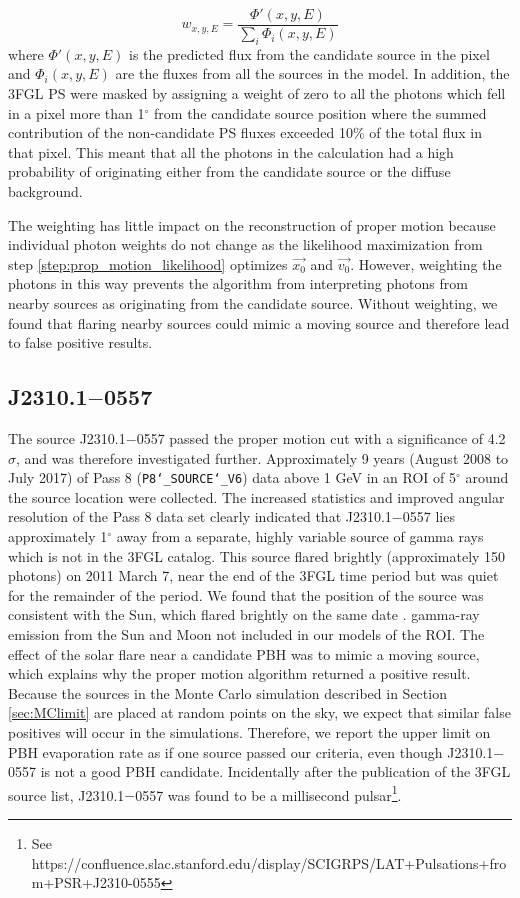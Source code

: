\begin{equation}
w_{x,y,E} = \frac{\Phi'(x,y,E)}{\sum_i \Phi_i(x,y,E)}
\end{equation}
where $\Phi'(x,y,E)$ is the predicted flux from the candidate source in the pixel and $\Phi_i(x,y,E)$ are the fluxes from all the sources in the model.
In addition, the 3FGL PS were masked by assigning a weight of zero to all the photons which fell in a pixel more than 1$^\circ$ from the candidate source position where the summed contribution of the non-candidate PS fluxes exceeded 10\% of the total flux in that pixel. This meant that all the photons in the calculation had a high probability of originating either from the candidate source or the diffuse background.

The weighting has little impact on the reconstruction of proper motion because individual photon weights do not change as the likelihood maximization from step \ref{step:prop_motion_likelihood} optimizes $\vec{x_0}$ and $\vec{v_0}$. However, weighting the photons in this way prevents the algorithm from interpreting photons from nearby sources as originating from the candidate source. Without weighting, we found that flaring nearby sources could mimic a moving source and therefore lead to false positive results.

\subsection{J2310.1$-$0557}
\label{sec:j2310}
The source J2310.1$-$0557 passed the proper motion cut with a significance of 4.2$\sigma$, and was therefore investigated further.
Approximately 9 years (August 2008 to July 2017) of Pass 8 (\texttt{P8\char`_SOURCE\char`_V6}) data above 1 GeV in an ROI of 5$^\circ$ around the source location were collected.
The increased statistics and improved angular resolution of the Pass 8 data set clearly indicated that J2310.1$-$0557 lies approximately 1$^\circ$ away from a separate, highly variable source of gamma rays which is not in the 3FGL catalog.
This source flared brightly (approximately 150 photons) on 2011 March 7, near the end of the 3FGL time period but was quiet for the remainder of the period.
We found that the position of the source was consistent with the Sun, which flared brightly on the same date \citep{2011ATel.3214....1A}.
gamma-ray emission from the Sun and Moon not included in our models of the ROI.
The effect of the solar flare near a candidate PBH was to mimic a moving source, which explains why the proper motion algorithm returned a positive result. 
Because the sources in the Monte Carlo simulation described in Section \ref{sec:MClimit} are placed at random points on the sky, we expect that similar false positives will occur in the simulations.
Therefore, we report the upper limit on PBH evaporation rate as if one source passed our criteria, even though J2310.1$-$0557 is not a good PBH candidate. Incidentally after the publication of the 3FGL source list, J2310.1$-$0557 was found to be a millisecond pulsar\footnote{See https://confluence.slac.stanford.edu/display/SCIGRPS/LAT+Pulsations+from+PSR+J2310-0555}.


